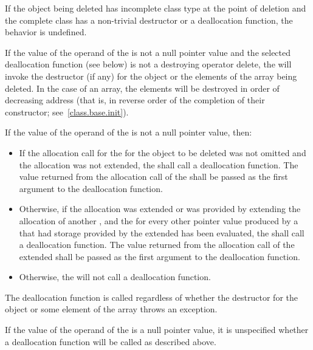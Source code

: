 \pnum
{}%
If the object being deleted has incomplete class type at the point of
deletion and the complete class has a non-trivial destructor or a
deallocation function, the behavior is undefined.

\pnum
{}%
If the value of the operand of the  is not a
null pointer value
and the selected deallocation function (see below)
is not a destroying operator delete,
the  will invoke the
destructor (if any) for the object or the elements of the array being
deleted. In the case of an array, the elements will be destroyed in
order of decreasing address (that is, in reverse order of the completion
of their constructor; see~\ref{class.base.init}).

\pnum
If the value of the operand of the  is not a
null pointer value, then:

\begin{itemize}
\item
If the allocation call for the  for the object to
be deleted was not omitted and the allocation was not extended, the
 shall call a deallocation
function. The value returned from the
allocation call of the  shall be passed as the
first argument to the deallocation function.

\item
Otherwise, if the allocation was extended or was provided by extending the
allocation of another , and the
 for every other pointer value produced by a
 that had storage provided by the extended
 has been evaluated, the
 shall call a deallocation function. The value
returned from the allocation call of the extended 
shall be passed as the first argument to the deallocation function.

\item
Otherwise, the  will not call a
deallocation function.
\end{itemize}
\begin{note}
The deallocation function is called regardless of whether the destructor
for the object or some element of the array throws an exception.
\end{note}
If the value of the operand of the  is a
null pointer value, it is unspecified whether a deallocation function will be
called as described above.

